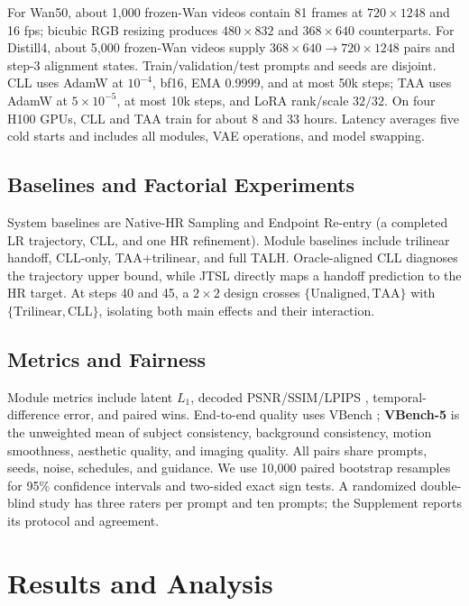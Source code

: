 For Wan50, about 1,000 frozen-Wan videos contain 81 frames at \(720\times1248\) and 16 fps; bicubic RGB resizing produces \(480\times832\) and \(368\times640\) counterparts. For Distill4, about 5,000 frozen-Wan videos supply \(368\times640\rightarrow720\times1248\) pairs and step-3 alignment states. Train/validation/test prompts and seeds are disjoint. CLL uses AdamW at \(10^{-4}\), bf16, EMA 0.9999, and at most 50k steps; TAA uses AdamW at \(5\times10^{-5}\), at most 10k steps, and LoRA rank/scale \(32/32\). On four H100 GPUs, CLL and TAA train for about 8 and 33 hours. Latency averages five cold starts and includes all modules, VAE operations, and model swapping.

\subsection{Baselines and Factorial Experiments}
\label{sec:factorialsetup}

System baselines are Native-HR Sampling and Endpoint Re-entry (a completed LR trajectory, CLL, and one HR refinement). Module baselines include trilinear handoff, CLL-only, TAA+trilinear, and full TALH. Oracle-aligned CLL diagnoses the trajectory upper bound, while JTSL directly maps a handoff prediction to the HR target. At steps 40 and 45, a \(2\times2\) design crosses \(\{\text{Unaligned},\text{TAA}\}\) with \(\{\text{Trilinear},\text{CLL}\}\), isolating both main effects and their interaction.

\subsection{Metrics and Fairness}

Module metrics include latent \(L_1\), decoded PSNR/SSIM/LPIPS \citep{zhang2018lpips}, temporal-difference error, and paired wins. End-to-end quality uses VBench \citep{huang2024vbench}; \textbf{VBench-5} is the unweighted mean of subject consistency, background consistency, motion smoothness, aesthetic quality, and imaging quality. All pairs share prompts, seeds, noise, schedules, and guidance. We use 10,000 paired bootstrap resamples for 95\% confidence intervals and two-sided exact sign tests. A randomized double-blind study has three raters per prompt and ten prompts; the Supplement reports its protocol and agreement.

\section{Results and Analysis}

